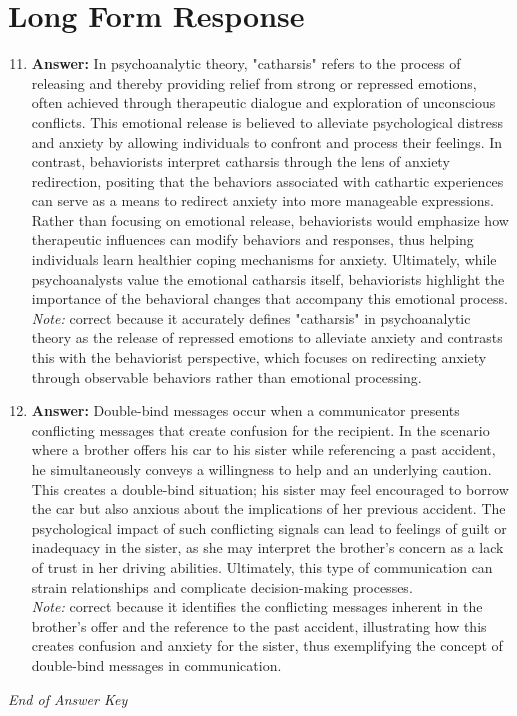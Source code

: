 \documentclass[12pt]{article}
\begin{document}
\section*{Long Form Response}
\begin{enumerate}[label=\arabic*.]
\setcounter{enumi}{10}
\item \textbf{Answer:} In psychoanalytic theory, "catharsis" refers to the process of releasing and thereby providing relief from strong or repressed emotions, often achieved through therapeutic dialogue and exploration of unconscious conflicts. This emotional release is believed to alleviate psychological distress and anxiety by allowing individuals to confront and process their feelings. In contrast, behaviorists interpret catharsis through the lens of anxiety redirection, positing that the behaviors associated with cathartic experiences can serve as a means to redirect anxiety into more manageable expressions. Rather than focusing on emotional release, behaviorists would emphasize how therapeutic influences can modify behaviors and responses, thus helping individuals learn healthier coping mechanisms for anxiety. Ultimately, while psychoanalysts value the emotional catharsis itself, behaviorists highlight the importance of the behavioral changes that accompany this emotional process.
\\ \textit{Note:} correct because it accurately defines "catharsis" in psychoanalytic theory as the release of repressed emotions to alleviate anxiety and contrasts this with the behaviorist perspective, which focuses on redirecting anxiety through observable behaviors rather than emotional processing.
\item \textbf{Answer:} Double-bind messages occur when a communicator presents conflicting messages that create confusion for the recipient. In the scenario where a brother offers his car to his sister while referencing a past accident, he simultaneously conveys a willingness to help and an underlying caution. This creates a double-bind situation; his sister may feel encouraged to borrow the car but also anxious about the implications of her previous accident. The psychological impact of such conflicting signals can lead to feelings of guilt or inadequacy in the sister, as she may interpret the brother's concern as a lack of trust in her driving abilities. Ultimately, this type of communication can strain relationships and complicate decision-making processes.
\\ \textit{Note:} correct because it identifies the conflicting messages inherent in the brother's offer and the reference to the past accident, illustrating how this creates confusion and anxiety for the sister, thus exemplifying the concept of double-bind messages in communication.
\end{enumerate}

\vfill
\noindent\textit{End of Answer Key}
\end{document}
